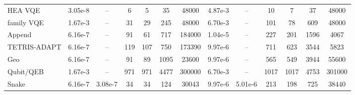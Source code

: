 \documentclass[
  reprint,
  amsmath,
  amssymb,
  aps,
  pra,
  nofootinbib,
  superscriptaddress,
  floatfix
]{revtex4-2}
\begin{document}
\begin{widetext}
\begin{minipage}{\textwidth}
\begin{center}
\begin{ruledtabular}
\begin{tabular}{p{}cccccc|cccccc}
\colrule
HEA VQE & 3.05e-8 & -- & 6 & 5 & 35 & 48000 & 4.87e-3 & -- & 10 & 7 & 37 & 48000\\
family VQE & 1.67e-3 & -- & 31 & 29 & 245 & 48000 & 6.70e-3 & -- & 101 & 78 & 609 & 48000\\
Append & 6.16e-7 & -- & 91 & 61 & 717 & 184000 & 1.04e-5 & -- & 227 & 201 & 1596 & 4067\\
TETRIS-ADAPT & 6.16e-7 & -- & 119 & 107 & 750 & 173390 & 9.97e-6 & -- & 711 & 623 & 3544 & 5823\\
Geo & 6.16e-7 & -- & 91 & 89 & 1095 & 23600 & 9.97e-6 & -- & 565 & 549 & 3944 & 55600\\
Qubit/QEB & 1.67e-3 & -- & 971 & 971 & 4477 & 300000 & 6.70e-3 & -- & 1017 & 1017 & 4753 & 301000\\
Snake & 6.16e-7 & 3.08e-7 & 34 & 34 & 124 & 30043 & 9.97e-6 & 5.01e-6 & 213 & 198 & 725 & 38440\\
\end{tabular}
\end{ruledtabular}
\end{center}
\end{minipage}
\par\addvspace{1.0ex}
\par\addvspace{1.0ex}
\end{widetext}
\fi
\end{document}
